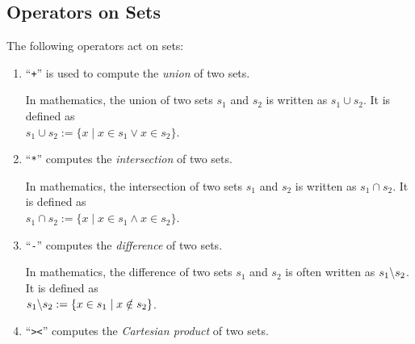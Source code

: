 \subsection{Operators on Sets}
The following operators act on sets:
\begin{enumerate}
\item ``\texttt{+}'' is used to compute the \emph{union} of two sets.

      In mathematics, the union of two sets $s_1$ and $s_2$ is  written
      as $s_1 \cup s_2$.  It is defined as
      \\[0.2cm]
      \hspace*{1.3cm}
      $s_1 \cup s_2 := \{ x \mid x \in s_1 \vee x \in  s_2 \}$.
\item ``\texttt{*}'' computes the \emph{intersection} of two sets. 

      In mathematics, the intersection of two sets $s_1$ and $s_2$ is  written
      as $s_1 \cap s_2$.  It is defined as
      \\[0.2cm]
      \hspace*{1.3cm}
      $s_1 \cap s_2 := \{ x \mid x \in s_1 \wedge x \in  s_2 \}$.
\item ``\texttt{-}'' computes the \emph{difference} of two sets.

      In mathematics, the difference of two sets $s_1$ and $s_2$ is often written
      as $s_1 \symbol{92} s_2$.  It is defined as
      \\[0.2cm]
      \hspace*{1.3cm}
      $s_1 \symbol{92} s_2 := \{ x \in s_1 \mid x \notin s_2 \}$.
\item ``\texttt{><}'' computes the \emph{Cartesian product} of two sets.


\end{enumerate}

